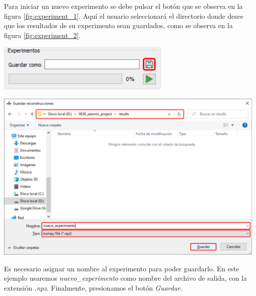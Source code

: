 \documentclass[12pt,twoside,letter]{ol-softwaremanual}
\newenvironment{Figure}
  {\par\medskip\noindent\minipage{\linewidth}}
  {\endminipage\par\medskip}
\begin{document}
\begin{multicols}{2}

Para iniciar un nuevo experimento se debe pulsar el botón \hspace{0.5mm} \faSave \hspace{0.5mm} que se observa en la figura \ref{fig:experiment_1}. Aquí el usuario seleccionará el directorio donde desee que los resultados de su experimento sean guardados, como se observa en la figura \ref{fig:experiment_2}.

\begin{Figure}
    \vspace{5mm}
    \centering
    \includegraphics[width=0.8\linewidth]{experiment-1.png}
    \label{fig:experiment_1}
\end{Figure}

\end{multicols}

\begin{Figure}
    \centering
    \includegraphics[width=1\linewidth]{experiment-2.png}
    \label{fig:experiment_2}
\end{Figure}

Es necesario asignar un nombre al experimento para poder guardarlo. En este ejemplo usaremos \emph{nuevo\_experimento} como nombre del archivo de salida, con la extensión \emph{.npz}. Finalmente, presionamos el botón \emph{Guardar}.
\end{document}
